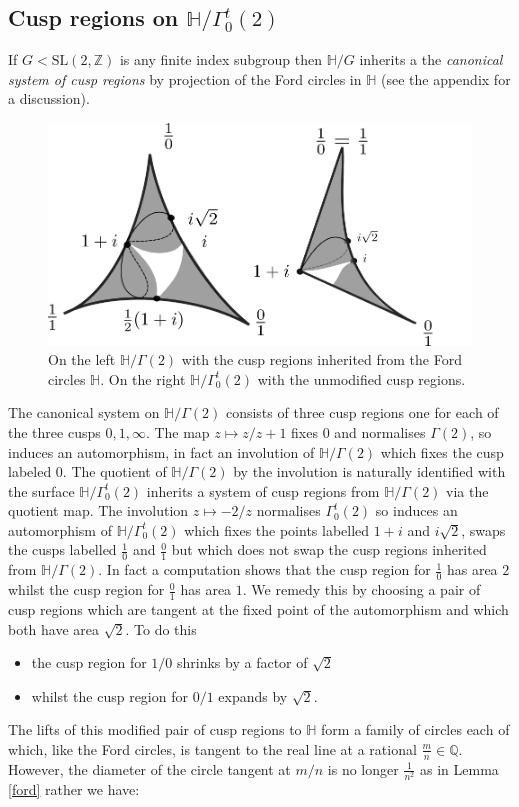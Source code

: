 \documentclass[12pt,a4paper]{amsart}
\def\HH{\mathbb{H}}
\def\g2{\Gamma(2)}
\def\ah{\Gamma_0^t(2)}
\def\oot{\HH / \ah}
\def\xx{\HH/\g2}
\def\ZZ{\mathbb{Z}}
\def\sl2{\mathrm{SL}(2, \ZZ)}
\begin{document}
\subsection{Cusp regions  on $\oot$}

If $G < \sl2$ is any finite index subgroup then 
$\mathbb{H}/G$ inherits a 
the \textit{canonical system of cusp regions}
by projection of the Ford circles in $\mathbb{H}$
(see the appendix for a discussion).


  \begin{figure}[H]
	  \label{cusp regions}
\begin{center}
\includegraphics[scale=.5]{hecke_cover.png} 
\end{center}
\caption{On the left $\xx$ with the cusp regions inherited from the
Ford circles  $\mathbb{H}$.
On the right $\oot$ with the unmodified cusp regions.}
\end{figure}

The canonical system on $\xx$ consists of three cusp regions 
one for each of the three cusps $0,1,\infty$.
The map $z\mapsto z/z+1$ fixes $0$ and normalises $\g2$,
so induces an automorphism, in fact an involution of $\xx$ which
fixes the cusp labeled $0$.
The quotient of $\xx$ by the involution is naturally identified with
the surface $\oot$
inherits a system of cusp regions from $\xx$ via the quotient map.
The involution $z\mapsto -2/z$ normalises $\ah$ so induces an
automorphism of $\oot$ which fixes the points labelled
$1+i$ and $i\sqrt 2$, swaps the cusps labelled
$\frac{1}{0}$ and
$\frac{0}{1}$ but which does not swap the cusp regions inherited
from $\xx$.
In fact a computation shows that the cusp region for $\frac{1}{0}$ has
area $2$ whilst the cusp region for $\frac{0}{1}$ has area $1$.
We remedy this by choosing a pair of cusp regions which are tangent
at the fixed point of the automorphism and which both have area $\sqrt 2$.
To do this 
\begin{itemize}
\item the cusp region for $1/0$ shrinks by a factor of
$\sqrt 2$ 
\item whilst the cusp region for $0/1$ expands by $\sqrt 2$.
\end{itemize}
The lifts of this modified pair of cusp regions to $\HH$ form a family of circles each of which, like the Ford
circles, is tangent to the real line at a rational
$\frac{m}{n}\in \mathbb{Q}$.
However, the diameter of the circle tangent at $m/n$ is no longer
$\frac{1}{n^2}$ as in Lemma \ref{ford} rather we have:
\end{document}
